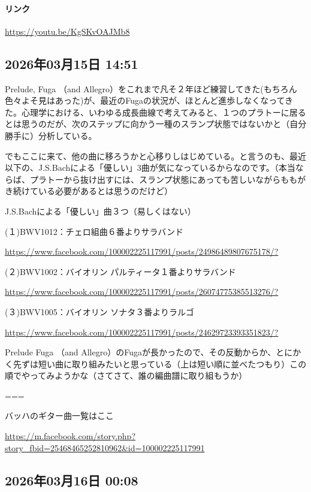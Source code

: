 \paragraph{リンク}
\url{https://youtu.be/KgSKvOAJMb8}

\subsection*{2026年03月15日 14:51}

Prelude, Fuga （and Allegro）をこれまで凡そ２年ほど練習してきた(もちろん色々よそ見はあった)が、最近のFugaの状況が、ほとんど進歩しなくなってきた。心理学における、いわゆる成長曲線で考えてみると、１つのプラトーに居るとは思うのだが、次のステップに向かう一種のスランプ状態ではないかと（自分勝手に）分析している。

でもここに来て、他の曲に移ろうかと心移りしはじめている。と言うのも、最近以下の、J.S.Bachによる「優しい」3曲が気になっているからなのです。（本当ならば、プラトーから抜け出すには、スランプ状態にあっても苦しいながらももがき続けている必要があるとは思うのだけど）

J.S.Bachによる「優しい」曲３つ（易しくはない）

(１)BWV1012：チェロ組曲６番よりサラバンド

\url{https://www.facebook.com/100002225117991/posts/24986489807675178/?}

(２)BWV1002：バイオリン パルティータ１番よりサラバンド

\url{https://www.facebook.com/100002225117991/posts/26074775385513276/?}

(３)BWV1005：バイオリン ソナタ３番よりラルゴ

\url{https://www.facebook.com/100002225117991/posts/24629723393351823/?}

Prelude Fuga （and Allegro）のFugaが長かったので、その反動からか、とにかく先ずは短い曲に取り組みたいと思っている（上は短い順に並べたつもり）この順でやってみようかな（さてさて、誰の編曲譜に取り組もうか）

===

バッハのギター曲一覧はここ

\url{https://m.facebook.com/story.php?story_fbid=25468465252810962&id=100002225117991}

\subsection*{2026年03月16日 00:08}

